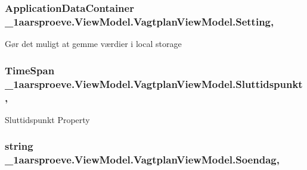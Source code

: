\subsubsection[{Setting}]{\setlength{\rightskip}{0pt plus 5cm}Application\+Data\+Container \+\_\+1aarsproeve.\+View\+Model.\+Vagtplan\+View\+Model.\+Setting\hspace{0.3cm}{\ttfamily [get]}, {\ttfamily [set]}}\label{class__1aarsproeve_1_1_view_model_1_1_vagtplan_view_model_aa5e675ea6389cdc802698037ced2e091}


Gør det muligt at gemme værdier i local storage 

\hypertarget{class__1aarsproeve_1_1_view_model_1_1_vagtplan_view_model_a049f0c84ca19cb72078132b243bf9023}{}
\subsubsection[{Sluttidspunkt}]{\setlength{\rightskip}{0pt plus 5cm}Time\+Span \+\_\+1aarsproeve.\+View\+Model.\+Vagtplan\+View\+Model.\+Sluttidspunkt\hspace{0.3cm}{\ttfamily [get]}, {\ttfamily [set]}}\label{class__1aarsproeve_1_1_view_model_1_1_vagtplan_view_model_a049f0c84ca19cb72078132b243bf9023}


Sluttidspunkt Property 

\hypertarget{class__1aarsproeve_1_1_view_model_1_1_vagtplan_view_model_abdd4c1e28095f4c2660a5ad71bab51ee}{}
\subsubsection[{Soendag}]{\setlength{\rightskip}{0pt plus 5cm}string \+\_\+1aarsproeve.\+View\+Model.\+Vagtplan\+View\+Model.\+Soendag\hspace{0.3cm}{\ttfamily [get]}, {\ttfamily [set]}}\label{class__1aarsproeve_1_1_view_model_1_1_vagtplan_view_model_abdd4c1e28095f4c2660a5ad71bab51ee}


